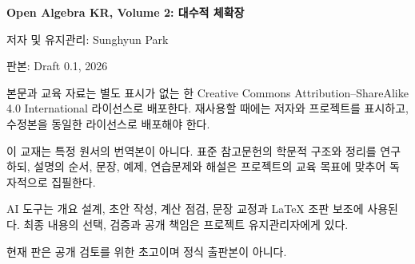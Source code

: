 \thispagestyle{empty}

\vspace*{\fill}

\noindent\textbf{Open Algebra KR, Volume 2: 대수적 체확장}

\medskip
\noindent 저자 및 유지관리: Sunghyun Park

\noindent 판본: Draft 0.1, 2026

\medskip
\noindent 본문과 교육 자료는 별도 표시가 없는 한 Creative Commons Attribution--ShareAlike 4.0 International 라이선스로 배포한다. 재사용할 때에는 저자와 프로젝트를 표시하고, 수정본을 동일한 라이선스로 배포해야 한다.

\medskip
\noindent 이 교재는 특정 원서의 번역본이 아니다. 표준 참고문헌의 학문적 구조와 정리를 연구하되, 설명의 순서, 문장, 예제, 연습문제와 해설은 프로젝트의 교육 목표에 맞추어 독자적으로 집필한다.

\medskip
\noindent AI 도구는 개요 설계, 초안 작성, 계산 점검, 문장 교정과 LaTeX 조판 보조에 사용된다. 최종 내용의 선택, 검증과 공개 책임은 프로젝트 유지관리자에게 있다.

\medskip
\noindent 현재 판은 공개 검토를 위한 초고이며 정식 출판본이 아니다.

\vspace*{\fill}
\clearpage

